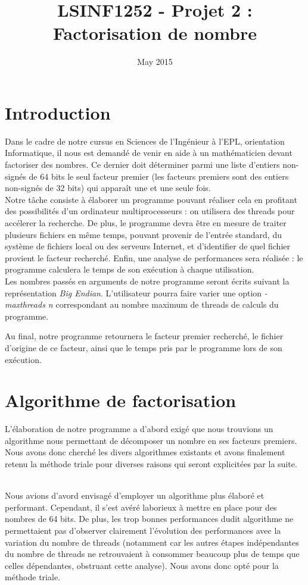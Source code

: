 \documentclass{article}
\title{LSINF1252 - Projet 2 : Factorisation de nombre}
\author{}
\date{May 2015}
\begin{document}


\section{Introduction}
Dans le cadre de notre cursus en Sciences de l'Ingénieur à l'EPL, orientation Informatique, 
il nous est demandé de venir en aide à un mathématicien devant factoriser des nombres. 
Ce dernier doit déterminer parmi une liste d'entiers non-signés de 64 bits le seul facteur
premier (les facteurs premiers sont des entiers non-signés de 32 bits) qui apparaît une 
et une seule fois.\\

\hspace{1cm}Notre tâche consiste à élaborer un programme pouvant réaliser cela en profitant
 des possibilités d'un ordinateur multiprocesseurs : on utilisera des threads pour accélerer
 la recherche. De plus, le programme devra être en mesure de traiter plusieurs fichiers en
 même temps, pouvant provenir de l'entrée standard, du système de fichiers local ou des serveurs
 Internet, et d'identifier de quel fichier provient le facteur recherché. Enfin, une analyse de
 performances sera réalisée : le programme calculera le temps de son exécution à chaque utilisation.\\

\hspace{1cm}Les nombres passés en arguments de notre programme seront écrits suivant la représentation
\emph{Big Endian}. L'utilisateur pourra faire varier une option \emph{-maxthreads n} correspondant
au nombre maximum de threads de calculs du programme.

\hspace{1cm}Au final, notre programme retournera le facteur premier recherché, le fichier d'origine
 de ce facteur, ainsi que le temps pris par le programme lors de son exécution.

\section{Algorithme de factorisation}
L'élaboration de notre programme a d'abord exigé que nous 
trouvions un algorithme nous permettant de décomposer un nombre en ses facteurs premiers. Nous
 avons donc cherché les divers algorithmes existants et avons finalement retenu la méthode 
triale pour diverses raisons qui seront explicitées par la suite.

\\
\hspace{1cm}Nous avions d'avord envisagé d'employer un algorithme plus élaboré et performant.
 Cependant, il s'est avéré laborieux à mettre en place pour des nombres de 64 bits. De plus,
 les trop bonnes performances dudit algorithme ne permettaient pas d'observer clairement 
l'évolution des performances avec la variation du nombre de threads (notamment car les autres
 étapes indépendantes du nombre de threads ne retrouvaient à consommer beaucoup plus de temps
 que celles dépendantes, obstruant cette analyse). Nous avons donc opté pour la méthode triale.
\\
\end{document}
